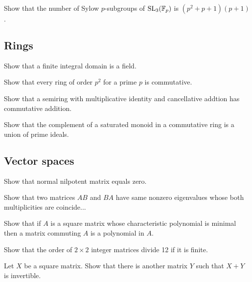 \documentclass[11pt]{article}
\begin{document}
	\begin{prb}
	Show that the number of Sylow $p$-subgroups of $\mathrm{SL}_3(\mathbb{F}_p)$ is $(p^2+p+1)(p+1)$.
	\end{prb}

	\subsection{Rings}
	\begin{prb}
	Show that a finite integral domain is a field.
	\end{prb}

	\begin{prb}
	Show that every ring of order $p^2$ for a prime $p$ is commutative.
	\end{prb}

	\begin{prb}
	Show that a semiring with multiplicative identity and cancellative addtion has commutative addition.
	\end{prb}

	\begin{prb}
	Show that the complement of a saturated monoid in a commutative ring is a union of prime ideals.
	\end{prb}

	\subsection{Vector spaces}
	\begin{prb}
	Show that normal nilpotent matrix equals zero.
	\end{prb}

	\begin{prb}
	Show that two matrices $AB$ and $BA$ have same nonzero eigenvalues whose both multiplicities are coincide...
	\end{prb}

	\begin{prb}
	Show that if $A$ is a square matrix whose characteristic polynomial is minimal then a matrix commuting $A$ is a polynomial in $A$.
	\end{prb}

	\begin{prb}
	Show that the order of $2\times 2$ integer matrices divide 12 if it is finite.
	\end{prb}

	\begin{prb}
	Let $X$ be a square matrix. Show that there is another matrix $Y$ such that $X+Y$ is invertible.
	\end{prb}
\end{document}
